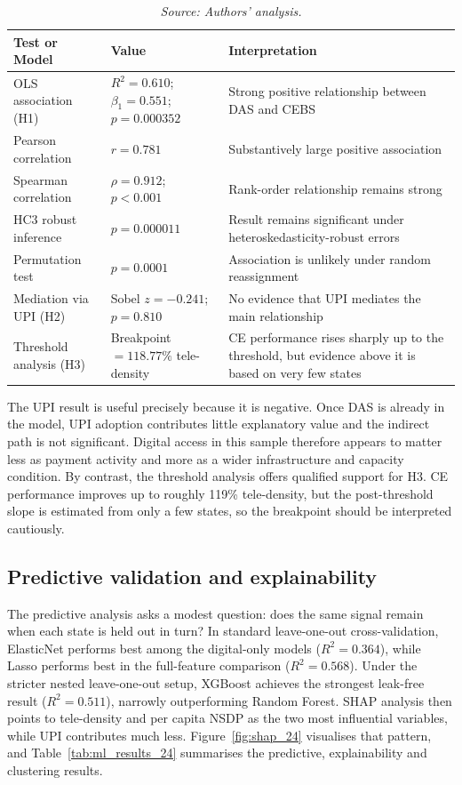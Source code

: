 \documentclass[10pt,a4paper]{article}
\newcommand{\tabsource}[1]{\caption*{\footnotesize\textit{Source: #1.}}}
\begin{document}
\begin{table}[htbp]
\centering
\caption{Core Statistical Results}
\label{tab:core_results_24}
\small
\begin{tabularx}{\textwidth}{@{}>{\raggedright\arraybackslash}X>{\raggedright\arraybackslash}p{2.2cm}>{\raggedright\arraybackslash}p{3.0cm}@{}}
\toprule
\textbf{Test or Model} & \textbf{Value} & \textbf{Interpretation} \\
\midrule
OLS association (H1) & $R^2=0.610$; $\beta_1=0.551$; $p=0.000352$ & Strong positive relationship between DAS and CEBS \\
Pearson correlation & $r=0.781$ & Substantively large positive association \\
Spearman correlation & $\rho=0.912$; $p<0.001$ & Rank-order relationship remains strong \\
HC3 robust inference & $p=0.000011$ & Result remains significant under heteroskedasticity-robust errors \\
Permutation test & $p=0.0001$ & Association is unlikely under random reassignment \\
Mediation via UPI (H2) & Sobel $z=-0.241$; $p=0.810$ & No evidence that UPI mediates the main relationship \\
Threshold analysis (H3) & Breakpoint $=118.77\%$ tele-density & CE performance rises sharply up to the threshold, but evidence above it is based on very few states \\
\bottomrule
\end{tabularx}
\tabsource{Authors' analysis}
\end{table}

The UPI result is useful precisely because it is negative. Once DAS is already in the model, UPI adoption contributes little explanatory value and the indirect path is not significant. Digital access in this sample therefore appears to matter less as payment activity and more as a wider infrastructure and capacity condition. By contrast, the threshold analysis offers qualified support for H3. CE performance improves up to roughly 119\% tele-density, but the post-threshold slope is estimated from only a few states, so the breakpoint should be interpreted cautiously.

\subsection{Predictive validation and explainability}

The predictive analysis asks a modest question: does the same signal remain when each state is held out in turn? In standard leave-one-out cross-validation, ElasticNet performs best among the digital-only models ($R^2=0.364$), while Lasso performs best in the full-feature comparison ($R^2=0.568$). Under the stricter nested leave-one-out setup, XGBoost achieves the strongest leak-free result ($R^2=0.511$), narrowly outperforming Random Forest. SHAP analysis then points to tele-density and per capita NSDP as the two most influential variables, while UPI contributes much less. Figure~\ref{fig:shap_24} visualises that pattern, and Table~\ref{tab:ml_results_24} summarises the predictive, explainability and clustering results.
\end{document}

